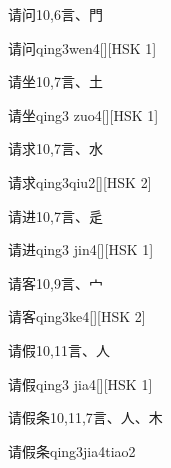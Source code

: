 \begin{entry}{请问}{10,6}{⾔、⾨}
  \begin{phonetics}{请问}{qing3wen4}[][HSK 1]
  \end{phonetics}
\end{entry}

\begin{entry}{请坐}{10,7}{⾔、⼟}
  \begin{phonetics}{请坐}{qing3 zuo4}[][HSK 1]
  \end{phonetics}
\end{entry}

\begin{entry}{请求}{10,7}{⾔、⽔}
  \begin{phonetics}{请求}{qing3qiu2}[][HSK 2]
  \end{phonetics}
\end{entry}

\begin{entry}{请进}{10,7}{⾔、⾡}
  \begin{phonetics}{请进}{qing3 jin4}[][HSK 1]
  \end{phonetics}
\end{entry}

\begin{entry}{请客}{10,9}{⾔、⼧}
  \begin{phonetics}{请客}{qing3ke4}[][HSK 2]
  \end{phonetics}
\end{entry}

\begin{entry}{请假}{10,11}{⾔、⼈}
  \begin{phonetics}{请假}{qing3 jia4}[][HSK 1]
  \end{phonetics}
\end{entry}

\begin{entry}{请假条}{10,11,7}{⾔、⼈、⽊}
  \begin{phonetics}{请假条}{qing3jia4tiao2}
  \end{phonetics}
\end{entry}


